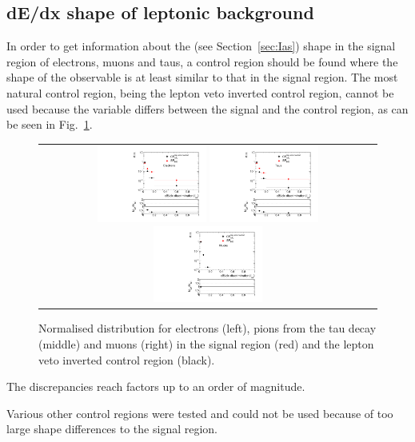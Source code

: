 \subsection{dE/dx shape of leptonic background}
In order to get information about the \ias (see Section~\ref{sec:Ias}) shape in the signal region of electrons, muons and taus, a control region should be found where the shape of the observable is at least similar to that in the
signal region.
The most natural control region, being the lepton veto inverted control region, cannot be used because the variable \ias differs between the signal and the control region, as can be seen in Fig.~\ref{fig:LeptonIasDist}.
\begin{figure}[!b]
  \centering 
  \begin{tabular}{c}
    \includegraphics[width=0.33\textwidth]{figures/analysis/Background/hASmi_Electrons_MCCR_MCSR.pdf}
    \includegraphics[width=0.33\textwidth]{figures/analysis/Background/hASmi_Taus_MCCR_MCSR.pdf}
    \includegraphics[width=0.33\textwidth]{figures/analysis/Background/hASmi_Muons_MCCR_MCSR.pdf}
  \end{tabular}
  \caption{Normalised \ias distribution for electrons (left), pions from the tau decay (middle) and muons (right) in the signal region (red) and the lepton veto inverted control region (black).}
  \label{fig:LeptonIasDist}
\end{figure}
The discrepancies reach factors up to an order of magnitude.

Various other control regions were tested and could not be used because of too large \ias shape differences to the signal region.

